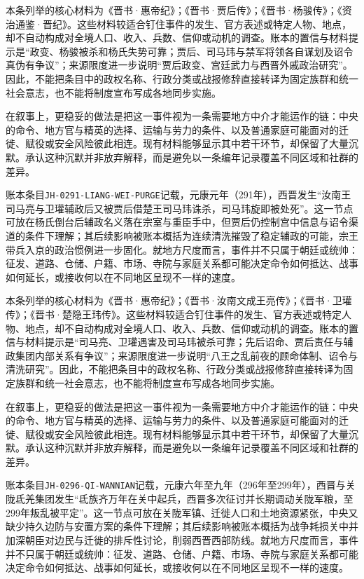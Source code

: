 本条列举的核心材料为《晋书·惠帝纪》；《晋书·贾后传》；《晋书·杨骏传》；《资治通鉴·晋纪》。这些材料较适合钉住事件的发生、官方表述或特定人物、地点，却不自动构成对全境人口、收入、兵数、信仰或动机的调查。账本的置信与材料提示是“政变、杨骏被杀和杨氏失势可靠；贾后、司马玮与禁军将领各自谋划及诏令真伪有争议”；来源限度进一步说明“贾后政变、宫廷武力与西晋外戚政治研究”。因此，不能把条目中的政权名称、行政分类或战报修辞直接转译为固定族群和统一社会意志，也不能将制度宣布写成各地同步实施。

在叙事上，更稳妥的做法是把这一事件视为一条需要地方中介才能运作的链：中央的命令、地方官与精英的选择、运输与劳力的条件、以及普通家庭可能面对的迁徙、赋役或安全风险彼此相连。现有材料能够显示其中若干环节，却保留了大量沉默。承认这种沉默并非放弃解释，而是避免以一条编年记录覆盖不同区域和社群的差异。

账本条目\texttt{JH-0291-LIANG-WEI-PURGE}记载，元康元年（291年），西晋发生“汝南王司马亮与卫瓘辅政后又被贾后借楚王司马玮诛杀，司马玮旋即被处死”。这一节点可放在杨氏倒台后辅政名义落在宗室与重臣手中，但贾后仍控制宫中信息与诏令渠道的条件下理解；其后续影响被账本概括为连续清洗摧毁了稳定辅政的可能，宗王带兵入京的政治惯例进一步固化。就地方尺度而言，事件并不只属于朝廷或统帅：征发、道路、仓储、户籍、市场、寺院与家庭关系都可能决定命令如何抵达、战事如何延长，或接收何以在不同地区呈现不一样的速度。

本条列举的核心材料为《晋书·惠帝纪》；《晋书·汝南文成王亮传》；《晋书·卫瓘传》；《晋书·楚隐王玮传》。这些材料较适合钉住事件的发生、官方表述或特定人物、地点，却不自动构成对全境人口、收入、兵数、信仰或动机的调查。账本的置信与材料提示是“司马亮、卫瓘遇害及司马玮被杀可靠；先后诏命、贾后责任与辅政集团内部关系有争议”；来源限度进一步说明“八王之乱前夜的顾命体制、诏令与清洗研究”。因此，不能把条目中的政权名称、行政分类或战报修辞直接转译为固定族群和统一社会意志，也不能将制度宣布写成各地同步实施。

在叙事上，更稳妥的做法是把这一事件视为一条需要地方中介才能运作的链：中央的命令、地方官与精英的选择、运输与劳力的条件、以及普通家庭可能面对的迁徙、赋役或安全风险彼此相连。现有材料能够显示其中若干环节，却保留了大量沉默。承认这种沉默并非放弃解释，而是避免以一条编年记录覆盖不同区域和社群的差异。

账本条目\texttt{JH-0296-QI-WANNIAN}记载，元康六年至九年（296年至299年），西晋与关陇氐羌集团发生“氐族齐万年在关中起兵，西晋多次征讨并长期调动关陇军粮，至299年叛乱被平定”。这一节点可放在关陇军镇、迁徙人口和土地资源紧张，中央又缺少持久边防与安置方案的条件下理解；其后续影响被账本概括为战争耗损关中并加深朝臣对边民与迁徙的排斥性讨论，削弱西晋西部防线。就地方尺度而言，事件并不只属于朝廷或统帅：征发、道路、仓储、户籍、市场、寺院与家庭关系都可能决定命令如何抵达、战事如何延长，或接收何以在不同地区呈现不一样的速度。

